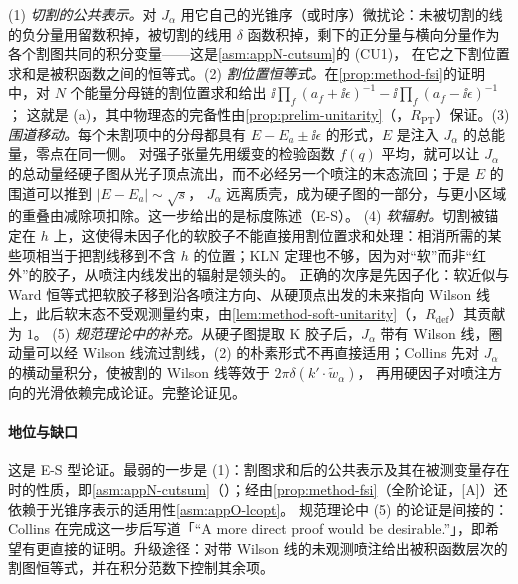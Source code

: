 \begin{proofsketch}
(1) \emph{切割的公共表示。}对 $J_\alpha$ 用它自己的光锥序（或时序）微扰论：未被切割的线的负分量用留数积掉，被切割的线用 $\delta$ 函数积掉，剩下的正分量与横向分量作为各个割图共同的积分变量——这是\cref{asm:appN-cutsum}的 (CU1)，
在它之下割位置求和是被积函数之间的恒等式。(2) \emph{割位置恒等式。}在\cref{prop:method-fsi}的证明中，对 $N$ 个能量分母链的割位置求和给出 $\ii\prod_f(a_f+\ii\epsilon)^{-1}-\ii\prod_f(a_f-\ii\epsilon)^{-1}$；
这就是 (a)，其中物理态的完备性由\cref{prop:prelim-unitarity}（\tagR，$R_{\mathrm{PT}}$）保证。(3) \emph{围道移动。}每个未割项中的分母都具有 $E-E_a\pm\ii\epsilon$ 的形式，$E$ 是注入 $J_\alpha$ 的总能量，零点在同一侧。
对强子张量先用缓变的检验函数 $f(q)$ 平均\cite[式~(12.11)]{Collins2011}，就可以让 $J_\alpha$ 的总动量经硬子图从光子顶点流出，而不必经另一个喷注的末态流回；于是 $E$ 的围道可以推到 $|E-E_a|\sim\sqrt s$，
$J_\alpha$ 远离质壳，成为硬子图的一部分，与更小区域的重叠由减除项扣除\cite[第~12.7~节]{Collins2011}。这一步给出的是标度陈述（E-S）。
(4) \emph{软辐射。}切割被锚定在 $h$ 上，这使得未因子化的软胶子不能直接用割位置求和处理：相消所需的某些项相当于把割线移到不含 $h$ 的位置；KLN 定理也不够，因为对“软”而非“红外”的胶子，从喷注内线发出的辐射是领头的\cite[第~12.5.2、12.5.3~节]{Collins2011}。
正确的次序是先因子化：软近似与 Ward 恒等式把软胶子移到沿各喷注方向、从硬顶点出发的未来指向 Wilson 线上，此后软末态不受观测量约束，由\cref{lem:method-soft-unitarity}（\tagR，$R_{\mathrm{def}}$）其贡献为 $1$。
(5) \emph{规范理论中的补充。}从硬子图提取 K 胶子后，$J_\alpha$ 带有 Wilson 线，圈动量可以经 Wilson 线流过割线，(2) 的朴素形式不再直接适用；Collins 先对 $J_\alpha$ 的横动量积分，使被割的 Wilson 线等效于 $2\pi\delta(k'\cdot\tilde w_\alpha)$，
再用硬因子对喷注方向的光滑依赖完成论证\cite[第~12.8.7~节]{Collins2011}。完整论证见\cite[第~12.7、12.8~节]{Collins2011}。
\end{proofsketch}

\paragraph{地位与缺口}
这是 E-S 型论证。最弱的一步是 (1)：割图求和后的公共表示及其在被测变量存在时的性质，即\cref{asm:appN-cutsum}（\tagA）；经由\cref{prop:method-fsi}（全阶论证，[A]）还依赖于光锥序表示的适用性\cref{asm:appO-lcopt}。
规范理论中 (5) 的论证是间接的：Collins 在完成这一步后写道「“A more direct proof would be desirable.”」\cite[第~12.8.7~节]{Collins2011}，即希望有更直接的证明。升级途径：对带 Wilson 线的未观测喷注给出被积函数层次的割图恒等式，并在积分范数下控制其余项。


